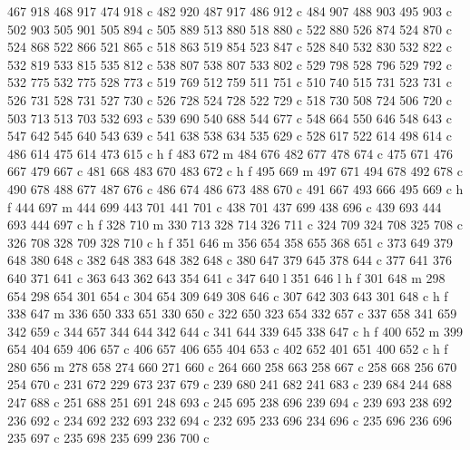 {{        467 918 468 917 474 918 c
        482 920 487 917 486 912 c
        484 907 488 903 495 903 c
        502 903 505 901 505 894 c
        505 889 513 880 518 880 c
        522 880 526 874 524 870 c
        524 868 522 866 521 865 c
        518 863 519 854 523 847 c
        528 840 532 830 532 822 c
        532 819 533 815 535 812 c
        538 807 538 807 533 802 c
        529 798 528 796 529 792 c
        532 775 532 775 528 773 c
        519 769 512 759 511 751 c
        510 740 515 731 523 731 c
        526 731 528 731 527 730 c
        526 728 524 728 522 729 c
        518 730 508 724 506 720 c
        503 713 513 703 532 693 c
        539 690 540 688 544 677 c
        548 664 550 646 548 643 c
        547 642 545 640 543 639 c
        541 638 538 634 535 629 c
        528 617 522 614 498 614 c
        486 614 475 614 473 615 c
        h f
        483 672 m
        484 676 482 677 478 674 c
        475 671 476 667 479 667 c
        481 668 483 670 483 672 c
        h f
        495 669 m
        497 671 494 678 492 678 c
        490 678 488 677 487 676 c
        486 674 486 673 488 670 c
        491 667 493 666 495 669 c
        h f
        444 697 m
        444 699 443 701 441 701 c
        438 701 437 699 438 696 c
        439 693 444 693 444 697 c
        h f
        328 710 m
        330 713 328 714 326 711 c
        324 709 324 708 325 708 c
        326 708 328 709 328 710 c
        h f
        351 646 m
        356 654 358 655 368 651 c
        373 649 379 648 380 648 c
        382 648 383 648 382 648 c
        380 647 379 645 378 644 c
        377 641 376 640 371 641 c
        363 643 362 643 354 641 c
        347 640 l
        351 646 l
        h f
        301 648 m
        298 654 298 654 301 654 c
        304 654 309 649 308 646 c
        307 642 303 643 301 648 c
        h f
        338 647 m
        336 650 333 651 330 650 c
        322 650 323 654 332 657 c
        337 658 341 659 342 659 c
        344 657 344 644 342 644 c
        341 644 339 645 338 647 c
        h f
        400 652 m
        399 654 404 659 406 657 c
        406 657 406 655 404 653 c
        402 652 401 651 400 652 c
        h f
        280 656 m
        278 658 274 660 271 660 c
        264 660 258 663 258 667 c
        258 668 256 670 254 670 c
        231 672 229 673 237 679 c
        239 680 241 682 241 683 c
        239 684 244 688 247 688 c
        251 688 251 691 248 693 c
        245 695 238 696 239 694 c
        239 693 238 692 236 692 c
        234 692 232 693 232 694 c
        232 695 233 696 234 696 c
        235 696 236 696 235 697 c
        235 698 235 699 236 700 c
}}
